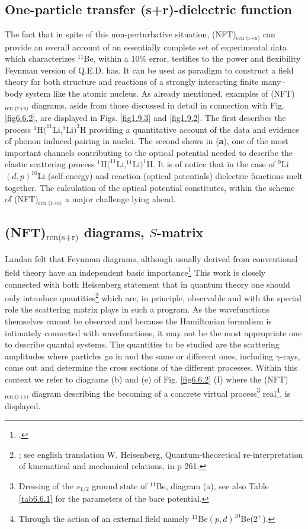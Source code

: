 \subsection{One-particle transfer (s+r)-dielectric function}
The fact that in spite of this non-perturbative situation, (NFT)$_{\text{ren (r+s)}}$ can provide an overall account of an essentially complete set of experimental data which characterizes $^{11}$Be, within a 10\% error, testifies to the power and flexibility Feynman version of Q.E.D. has. It can be used as paradigm to construct a field theory for both structure and reactions of a strongly interacting finite many--body system like the atomic nucleus. As already mentioned, examples of (NFT)$_{\text{ren (r+s)}}$ diagrams, aside from those discussed in detail in connection with Fig. \ref{fig6.6.2}, are displayed in Figs. \ref{fig1.9.3} and \ref{fig1.9.2}. The first describes the process  $^1$H$(^{11}$Li,$^9$Li$)^3$H providing a quantitative account of the data and  evidence of phonon induced pairing in nuclei. The second shows in (\textbf{a}), one of the most important channels contributing to the optical potential needed to describe the elastic scattering process $^1$H$(^{11}$Li,$^{11}$Li$)^1$H. It is of notice that in the case of $^9$Li$(d,p)^{10}$Li (self-energy) and reaction (optical potentials) dielectric functions melt together.
The calculation of the optical potential constitutes, within the scheme of (NFT)$_{\text{ren (r+s)}}$ a major challenge lying ahead.
\subsection{(NFT)$_{\text{ren(s+r)}}$ diagrams, $S$-matrix}\label{S6.6.2}
Landau felt that Feynman diagrams, although usually derived from conventional field theory have an independent basic importance\footnote{\cite{Landau:59}.} This work is closely connected with both Heisenberg statement that in quantum theory one should only introduce   quantities\footnote{\cite{Heisenberg:25}; see english translation W. Heisenberg, Quantum-theoretical re-interpretation of kinematical and mechanical relations, in \cite{VanderWaerden:67} p 261.} which are, in principle, observable and with the special role the scattering matrix plays in such a program. As the wavefunctions themselves cannot be observed and because the Hamiltonian formalism is intimately connected with wavefunctions, it may not be the most appropriate one to describe quantal systems. The quantities to be studied are the scattering amplitudes where particles go in and the same or different ones, including $\gamma$-rays, come out and  determine the cross sections of the different  processes.
Within this context we refer to diagrams (b) and (e) of Fig. \ref{fig6.6.2} (I) where the (NFT)$_{\text{ren (r+s)}}$  diagram describing the becoming of a concrete virtual process\footnote{Dressing of the $s_{1/2}$ ground state of $^{11}$Be, diagram (a), see also Table \ref{tab6.6.1} for the parameters of the bare potential.} real\footnote{Through the action of an external field namely $^{11}$Be$(p,d)^{10}$Be($2^+$).},  is displayed.  




